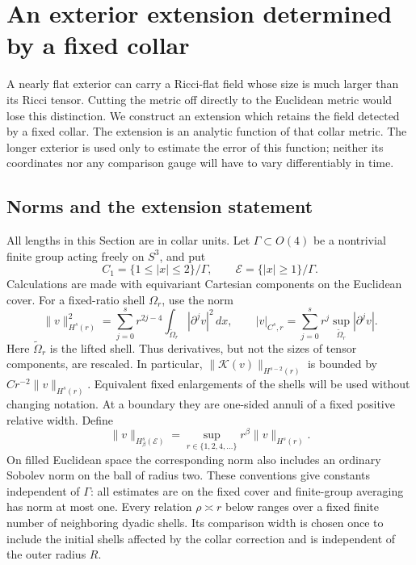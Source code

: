 \section{An exterior extension determined by a fixed collar}
\label{sec:collar}

A nearly flat exterior can carry a Ricci-flat field whose size is much
larger than its Ricci tensor.  Cutting the metric off directly to the
Euclidean metric would lose this distinction.  We construct an extension
which retains the field detected by a fixed collar.  The extension is an
analytic function of that collar metric.  The longer exterior is used
only to estimate the error of this function; neither its coordinates nor
any comparison gauge will have to vary differentiably in time.

\subsection{Norms and the extension statement}
\label{collar:statement}

All lengths in this Section are in collar units.  Let
\(\Gamma\subset O(4)\) be a nontrivial finite group acting freely on
\(S^3\), and put
\[
 C_1=\{1\le |x|\le2\}/\Gamma,\qquad
 \mathcal E=\{|x|\ge1\}/\Gamma.
\]
Calculations are made with equivariant Cartesian components on the
Euclidean cover.  For a fixed-ratio shell \(\Omega_r\), use the norm
\begin{equation}
 \|v\|_{H^s(r)}^2
 =\sum_{j=0}^s r^{2j-4}\int_{\widetilde\Omega_r}|\partial^jv|^2\,dx,
 \qquad
 |v|_{C^s,r}=\sum_{j=0}^s r^j\sup_{\widetilde\Omega_r}|\partial^jv|.
 \label{collar:scaled-norms}
\end{equation}
Here \(\widetilde\Omega_r\) is the lifted shell.  Thus derivatives, but
not the sizes of tensor components, are rescaled.  In particular,
\(\|\mathcal K(v)\|_{H^{s-2}(r)}\) is bounded by
\(Cr^{-2}\|v\|_{H^s(r)}\).  Equivalent fixed enlargements of the shells
will be used without changing notation.  At a boundary they are
one-sided annuli of a fixed positive relative width.  Define
\[
 \|v\|_{H^s_\beta(\mathcal E)}
   =\sup_{r\in\{1,2,4,\ldots\}}r^\beta\|v\|_{H^s(r)}.
\]
On filled Euclidean space the corresponding norm also includes an
ordinary Sobolev norm on the ball of radius two.  These conventions
give constants independent of \(\Gamma\): all estimates are on the
fixed cover and finite-group averaging has norm at most one.
Every relation \(\rho\asymp r\) below ranges over a fixed finite
number of neighboring dyadic shells.  Its comparison width is
chosen once to include the initial shells affected by the collar
correction and is independent of the outer radius \(R\).

